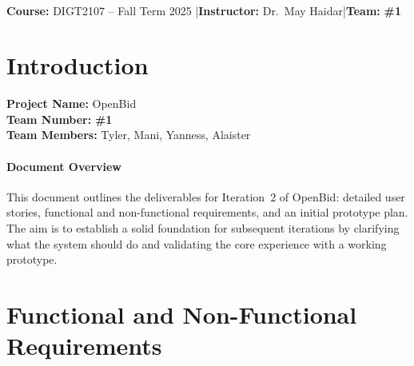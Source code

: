 \documentclass[11pt]{article}
\title{\course\\\large \iteration\\[6pt]\project}
\author{\teammates}
\date{\duedate}
\newcommand{\project}{OpenBid}
\newcommand{\instructor}{Dr.\ May Haidar}
\newcommand{\teamnum}{1}
\newcommand{\teammates}{Tyler, Mani, Yanness, Alaister}
\begin{document}
\maketitle

\begin{center}
\textbf{Course:} DIGT2107 -- Fall Term 2025 \quad|\quad \textbf{Instructor:} \instructor \quad|\quad \textbf{Team:} \textbf{\#\teamnum}
\end{center}

\tableofcontents
\newpage

\section{Introduction}
\textbf{Project Name:} \project\\
\textbf{Team Number:} \textbf{\#\teamnum}\\
\textbf{Team Members:} \teammates

\paragraph{Document Overview}
This document outlines the deliverables for Iteration~2 of \project: detailed user stories, functional and non-functional requirements, and an initial prototype plan. The aim is to establish a solid foundation for subsequent iterations by clarifying what the system should do and validating the core experience with a working prototype.

\section{Functional and Non-Functional Requirements}
\end{document}
